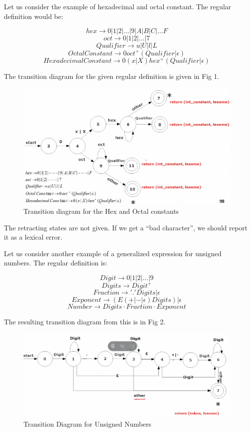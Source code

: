 \documentclass[12pt,letterpaper]{amsbook}
\theoremstyle{definition}
\begin{document}
Let us consider the example of hexadecimal and octal constant. The regular definition would be:

\[hex \rightarrow 0|1|2|...|9|A|B|C|...F\]
\[oct \rightarrow 0|1|2|...|7\]
\[Qualifier \rightarrow u|U|l|L\]
\[OctalConstant\rightarrow 0 oct^+(Qualifier|\epsilon)\]
\[HexadecimalConstant\rightarrow 0(x|X)hex^+(Qualifier|\epsilon)\]

The transition diagram for the given regular definition is given in Fig 1.

\begin{figure}[htpb]
  \centering
  \includegraphics[width=0.8\linewidth]{./assets/hex_oct_trans_diag.png}
  \caption{Transition diagram for the Hex and Octal constants}%
  \label{fig:}
\end{figure}

The retracting states are not given. If we get a ``bad character'', we should report it as a lexical error.

Let us consider another example of a generalized expression for unsigned numbers. The regular definition is:

\[Digit \rightarrow 0|1|2|...|9\]
\[Digits \rightarrow Digit^+\]
\[Fraction \rightarrow '.'Digits|\epsilon\]
\[Exponent \rightarrow (E(+|-|\epsilon)Digits)|\epsilon\]
\[Number \rightarrow Digits \cdot Fraction \cdot Exponent\]

The resulting transition diagram from this is in Fig 2.

\begin{figure}[htpb]
  \centering
  \includegraphics[width=0.8\linewidth]{./assets/unsigned_num_trans_diag.png}
  \caption{Transition Diagram for Unsigned Numbers}%
  \label{fig:}
\end{figure}
\end{document}
